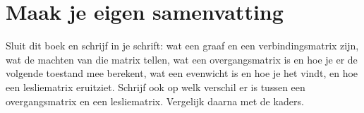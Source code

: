 
\begin{oefeningen}






\end{oefeningen}


\ifzelfstudie
\section*{Maak je eigen samenvatting}
Sluit dit boek en schrijf in je schrift: wat een graaf en een verbindingsmatrix zijn, wat de machten van die matrix tellen, wat een overgangsmatrix is en hoe je er de volgende toestand mee berekent, wat een evenwicht is en hoe je het vindt, en hoe een lesliematrix eruitziet. Schrijf ook op welk verschil er is tussen een overgangsmatrix en een lesliematrix. Vergelijk daarna met de kaders.
\fi
